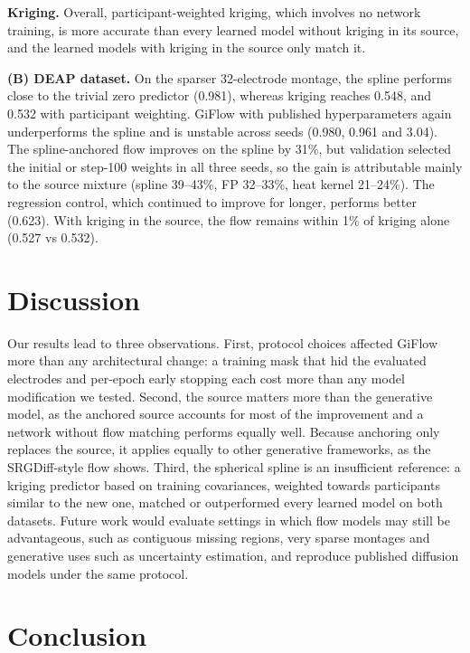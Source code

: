 \documentclass{article}
\begin{document}
\textbf{Kriging.} Overall, participant-weighted kriging, which involves no
network training, is more accurate than every learned model without
kriging in its source, and the learned models with kriging in the source
only match it.

\textbf{(B) DEAP dataset.} On the sparser 32-electrode montage, the spline performs
close to the trivial zero predictor (0.981), whereas kriging
reaches 0.548, and 0.532 with participant weighting. GiFlow
with published hyperparameters again underperforms the spline and is
unstable across seeds (0.980, 0.961 and 3.04). The spline-anchored flow
improves on the spline by 31\%, but validation selected the initial or
step-100 weights in all three seeds, so the gain is attributable mainly
to the source mixture (spline 39--43\%, FP 32--33\%, heat kernel
21--24\%). The regression control, which continued to improve for longer,
performs better (0.623). With kriging in the source, the flow remains
within 1\% of kriging alone (0.527 vs 0.532).

\section{Discussion}
\label{sec:discussion}

Our results lead to three observations. First, protocol choices affected
GiFlow more than any architectural change: a training mask that hid the
evaluated electrodes and per-epoch early stopping each cost more than any
model modification we tested. Second, the source matters more than the
generative model, as the anchored source accounts for most of the
improvement and a network without flow matching performs equally well.
Because anchoring only replaces the source, it applies equally to other
generative frameworks, as the SRGDiff-style flow shows. Third, the
spherical spline is an insufficient reference: a kriging
predictor based on training covariances, weighted towards participants
similar to the new one, matched or outperformed every learned model on
both datasets.
Future work would evaluate settings in which flow models may still be
advantageous, such as contiguous missing regions, very sparse montages and
generative uses such as uncertainty estimation, and reproduce
published diffusion models under the same protocol.

\section{Conclusion}
\label{sec:conclusion}
\end{document}
